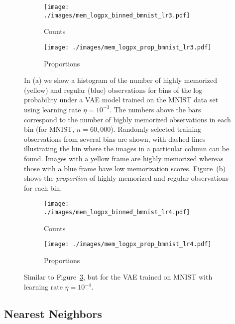 \documentclass{article}
\begin{document}
\begin{figure}[h]
	\centering
	\captionsetup[subfigure]{justification=centering}%
	\begin{subfigure}[b]{0.51\textwidth}
		\texttt{[image: ./images/mem\_logpx\_binned\_bmnist\_lr3.pdf]}
		\caption{Counts \label{fig:app_mnist_lr3_logpx_bins}}
	\end{subfigure}
	\qquad
	\begin{subfigure}[b]{0.43\textwidth}
		\texttt{[image: ./images/mem\_logpx\_prop\_bmnist\_lr3.pdf]}
		\caption{Proportions \label{fig:app_mnist_lr3_logpx_prop}}
	\end{subfigure}
	\caption{In (a) we show a histogram of the number of highly memorized 
		(\textcolor{MyYellow}{yellow}) and regular 
		(\textcolor{MyBlue}{blue}) observations for bins of the log 
		probability under a VAE model trained on the MNIST data set 
		using learning rate $\eta = 10^{-3}$. The numbers above the 
		bars correspond to the number of highly memorized observations 
		in each bin (for MNIST, $n = 60,000$). Randomly selected 
		training observations from several bins are shown, with dashed 
		lines illustrating the bin where the images in a particular 
		column can be found. Images with a yellow frame are highly 
		memorized whereas those with a blue frame have low 
		memorization scores. Figure~(b) shows the \emph{proportion} of 
		highly memorized and regular observations for each bin.
		\label{fig:app_mnist_lr3_logpxs}}
\end{figure}

\begin{figure}[h]
	\centering
	\captionsetup[subfigure]{justification=centering}%
	\begin{subfigure}[b]{0.51\textwidth}
		\texttt{[image: ./images/mem\_logpx\_binned\_bmnist\_lr4.pdf]}
		\caption{Counts \label{fig:app_mnist_lr4_logpx_bins}}
	\end{subfigure}
	\qquad
	\begin{subfigure}[b]{0.43\textwidth}
		\texttt{[image: ./images/mem\_logpx\_prop\_bmnist\_lr4.pdf]}
		\caption{Proportions \label{fig:app_mnist_lr4_logpx_prop}}
	\end{subfigure}
	\caption{Similar to Figure~\ref{fig:app_mnist_lr3_logpxs}, but for the 
		VAE trained on MNIST with learning rate $\eta = 10^{-4}$.
		\label{fig:app_mnist_lr4_logpxs}}
\end{figure}

\FloatBarrier
\clearpage
\subsection{Nearest Neighbors}%
\label{app:nearest_neighbors}
\end{document}
